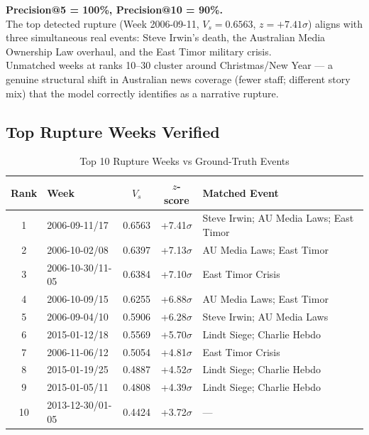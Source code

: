 \documentclass[12pt,a4paper]{article}
\begin{document}
\begin{resultbox}
\textbf{Precision@5 = 100\%, Precision@10 = 90\%.}\\
The top detected rupture (Week 2006-09-11, $V_s = 0.6563$, $z = +7.41\sigma$) aligns with
three simultaneous real events: Steve Irwin's death, the Australian Media Ownership Law
overhaul, and the East Timor military crisis.\\
Unmatched weeks at ranks 10--30 cluster around Christmas/New Year — a genuine structural
shift in Australian news coverage (fewer staff; different story mix) that the model
correctly identifies as a narrative rupture.
\end{resultbox}

\subsection{Top Rupture Weeks Verified}

\begin{table}[H]
\centering
\caption{Top 10 Rupture Weeks vs Ground-Truth Events}
\begin{tabular}{clccp{5cm}}
\toprule
\textbf{Rank} & \textbf{Week} & \textbf{$V_s$} & \textbf{$z$-score} & \textbf{Matched Event} \\
\midrule
1  & 2006-09-11/17 & 0.6563 & +7.41$\sigma$ & Steve Irwin; AU Media Laws; East Timor \\
2  & 2006-10-02/08 & 0.6397 & +7.13$\sigma$ & AU Media Laws; East Timor \\
3  & 2006-10-30/11-05 & 0.6384 & +7.10$\sigma$ & East Timor Crisis \\
4  & 2006-10-09/15 & 0.6255 & +6.88$\sigma$ & AU Media Laws; East Timor \\
5  & 2006-09-04/10 & 0.5906 & +6.28$\sigma$ & Steve Irwin; AU Media Laws \\
6  & 2015-01-12/18 & 0.5569 & +5.70$\sigma$ & Lindt Siege; Charlie Hebdo \\
7  & 2006-11-06/12 & 0.5054 & +4.81$\sigma$ & East Timor Crisis \\
8  & 2015-01-19/25 & 0.4887 & +4.52$\sigma$ & Lindt Siege; Charlie Hebdo \\
9  & 2015-01-05/11 & 0.4808 & +4.39$\sigma$ & Lindt Siege; Charlie Hebdo \\
10 & 2013-12-30/01-05 & 0.4424 & +3.72$\sigma$ & --- \\
\bottomrule
\end{tabular}
\label{tab:top10}
\end{table}
\end{document}
